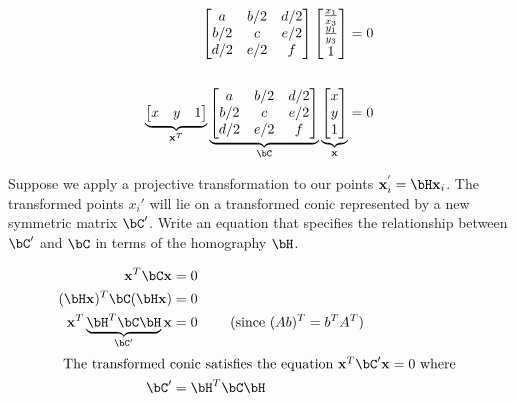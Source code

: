 \begin{problem}
\begin{enumalph}
\begin{answer}
\begin{align*}
\begin{bmatrix}
            a & b/2 & d/2 \\
            b/2 & c & e/2 \\
            d/2 & e/2 & f \\
          \end{bmatrix}
          \begin{bmatrix}
            \frac{x_1}{x_3} \\
            \frac{y_1}{y_3} \\
            1 \\
          \end{bmatrix}
          &= 0 \\ \\
          \underbrace{\begin{bmatrix}
            x & y & 1 \\
          \end{bmatrix}}_{\bx^T}
          \underbrace{\begin{bmatrix}
            a & b/2 & d/2 \\
            b/2 & c & e/2 \\
            d/2 & e/2 & f \\
          \end{bmatrix}}_{\bC}
          \underbrace{\begin{bmatrix}
            x \\
            y \\
            1 \\
          \end{bmatrix}}_{\bx}
          &= 0
        \end{align*}
      \end{answer}

    \newpage
    \item Suppose we apply a projective transformation to our
      points $\bx_i^{'} = \bH\bx_i$.
      The transformed points $x_i'$ will lie on a transformed
      conic represented by a new symmetric matrix $\bC'$.
      Write an equation that specifies the relationship between
      $\bC'$ and $\bC$ in terms of the homography $\bH$.
      \begin{answer}
        \begin{align*}
          \bx^T\bC\bx &= 0 \\
          (\bH\bx)^T\bC(\bH\bx) &= 0 \\
          \bx^T \underbrace{\bH^T\bC\bH}_{\bC'}\bx &= 0 \qquad \text{ (since ${(Ab)^T = b^TA^T}$) } \\
          \intertext{
            The transformed conic satisfies the equation
            $\bx^T\bC'\bx = 0$ where
          }
          \bC' &= \bH^T\bC\bH
        \end{align*}
      \end{answer}
  \end{enumalph}
\end{problem}
